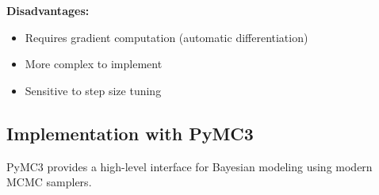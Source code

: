 \textbf{Disadvantages:}
\begin{itemize}
    \item Requires gradient computation (automatic differentiation)
    \item More complex to implement
    \item Sensitive to step size tuning
\end{itemize}

\subsection{Implementation with PyMC3}

PyMC3 provides a high-level interface for Bayesian modeling using modern MCMC samplers.

\lstset{language=Python, caption=PyMC3 Implementation of Bayesian A/B Test}
